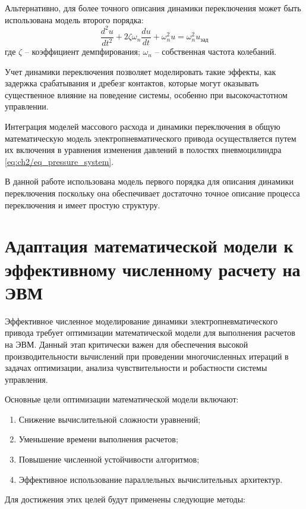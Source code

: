 Альтернативно, для более точного описания динамики переключения
может быть использована модель второго порядка:
\begin{equation}
    \frac{d^2u}{dt^2} + 2\zeta\omega_n\frac{du}{dt} + \omega_n^2u = \omega_n^2u_{зад}
\end{equation}
где $\zeta$ -- коэффициент демпфирования;
$\omega_n$ -- собственная частота колебаний.

Учет динамики переключения позволяет моделировать такие эффекты, как задержка
срабатывания и дребезг контактов, которые могут оказывать
существенное влияние на поведение системы,
особенно при высокочастотном управлении.

Интеграция моделей массового расхода и динамики переключения
в общую математическую модель электропневматического привода
осуществляется путем их включения в уравнения
изменения давлений в полостях пневмоцилиндра \ref{eq:ch2/eq_pressure_system}.

В данной работе использована модель первого порядка для описания динамики переключения
поскольку она обеспечивает достаточно точное описание процесса переключения
и имеет простую структуру.


\section{Адаптация математической модели к эффективному численному расчету на ЭВМ}\label{sec:ch2/sec5}

Эффективное численное моделирование динамики электропневматического привода требует
оптимизации математической модели для выполнения расчетов на ЭВМ.
Данный этап критически важен для обеспечения высокой производительности
вычислений при проведении многочисленных итераций в задачах оптимизации,
анализа чувствительности и робастности системы управления.

Основные цели оптимизации математической модели включают:

\begin{enumerate}
    \item Снижение вычислительной сложности уравнений;
    \item Уменьшение времени выполнения расчетов;
    \item Повышение численной устойчивости алгоритмов;
    \item Эффективное использование параллельных вычислительных архитектур.
\end{enumerate}

Для достижения этих целей будут применены следующие методы:

